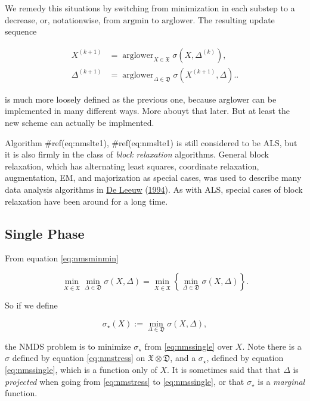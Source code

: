 \documentclass[
  12pt,
]{book}
\theoremstyle{definition}
\theoremstyle{definition}
\theoremstyle{definition}
\theoremstyle{definition}
\theoremstyle{remark}
\begin{document}
We remedy this situations by switching from minimization in each substep to
a decrease, or, notationwise, from \(\text{argmin}\) to \(\text{arglower}\). The resulting
update sequence

\begin{align}
X^{(k+1)}&=\mathop{\text{arglower}}_{X\in\mathfrak{X}}\sigma(X,\Delta^{(k)}),\label{eq:nmslte1}\\
\Delta^{(k+1)}&=\mathop{\text{arglower}}_{\Delta\in\mathfrak{D}}\sigma(X^{(k+1)},\Delta).\label{eq:nmslte2}.
\end{align}

is much more loosely defined as the previous one, because arglower can be implemented in many different ways. More abouyt that later. But at least the new scheme can actually be implmented.

Algorithm \#ref(eq:nmslte1), \#ref(eq:nmslte1) is still considered to be ALS, but it is also firmly in the class of \emph{block relaxation} algorithms. General block relaxation, which has alternating least squares, coordinate relaxation, augmentation, EM, and majorization as special cases, was used to describe many data analysis algorithms in \protect\hyperlink{ref-deleeuw_C_94c}{De Leeuw} (\protect\hyperlink{ref-deleeuw_C_94c}{1994}). As with ALS, special cases of block relaxation have been around for a long time.

\hypertarget{nmssinglephase}{%
\subsection{Single Phase}\label{nmssinglephase}}

From equation \eqref{eq:nmsminmin}

\begin{equation}
\min_{X\in\mathfrak{X}}\min_{\Delta\in\mathfrak{D}}\sigma(X,\Delta)=\min_{X\in\mathfrak{X}}\left\{\min_{\Delta\in\mathfrak{D}}\sigma(X,\Delta)\right\}.
\label{eq:nmsminsin}
\end{equation}

So if we define

\begin{equation}
\sigma_\star(X):=\min_{\Delta\in\mathfrak{D}}\sigma(X,\Delta),
\label{eq:nmssingle}
\end{equation}

the NMDS problem is to minimize \(\sigma_\star\) from \eqref{eq:nmssingle} over \(X\).
Note there is a \(\sigma\) defined by
equation \eqref{eq:nmstress}
on \(\mathfrak{X}\otimes\mathfrak{D}\), and a \(\sigma_\star\), defined by equation \eqref{eq:nmssingle}, which is a function only of \(X\). It is sometimes said that that \(\Delta\) is \emph{projected} when going from \eqref{eq:nmstress} to \eqref{eq:nmssingle}, or that \(\sigma_\star\) is a \emph{marginal} function.
\end{document}
